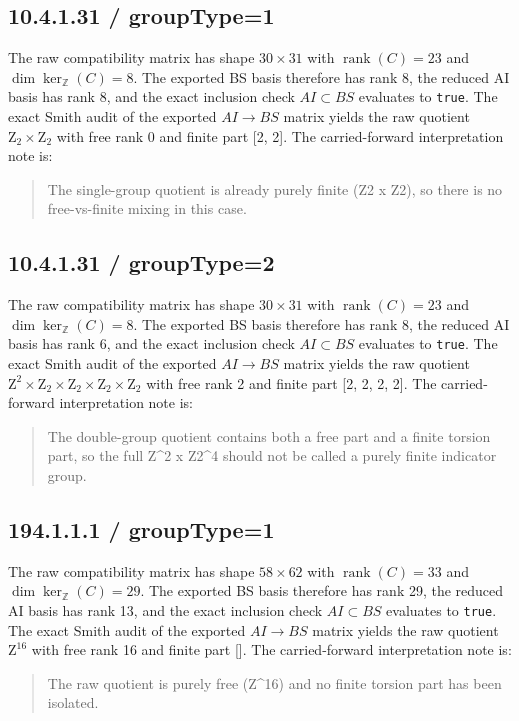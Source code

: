 \documentclass[11pt]{article}
\begin{document}
        \subsection*{10.4.1.31 / groupType=1}
The raw compatibility matrix has shape $30 \times 31$ with
$\operatorname{rank}(C) = 23$ and
$\dim \ker_{\mathbb Z}(C) = 8$.
The exported BS basis therefore has rank 8, the reduced AI basis has rank 8,
and the exact inclusion check $AI \subset BS$ evaluates to \texttt{true}.
The exact Smith audit of the exported $AI \to BS$ matrix yields the raw quotient
$\mathrm{Z}_{2} \times \mathrm{Z}_{2}$ with free rank 0 and finite part [2, 2].
The carried-forward interpretation note is:
\begin{quote}
The single-group quotient is already purely finite (Z2 x Z2), so there is no free-vs-finite mixing in this case.
\end{quote}
\subsection*{10.4.1.31 / groupType=2}
The raw compatibility matrix has shape $30 \times 31$ with
$\operatorname{rank}(C) = 23$ and
$\dim \ker_{\mathbb Z}(C) = 8$.
The exported BS basis therefore has rank 8, the reduced AI basis has rank 6,
and the exact inclusion check $AI \subset BS$ evaluates to \texttt{true}.
The exact Smith audit of the exported $AI \to BS$ matrix yields the raw quotient
$\mathrm{Z}^{2} \times \mathrm{Z}_{2} \times \mathrm{Z}_{2} \times \mathrm{Z}_{2} \times \mathrm{Z}_{2}$ with free rank 2 and finite part [2, 2, 2, 2].
The carried-forward interpretation note is:
\begin{quote}
The double-group quotient contains both a free part and a finite torsion part, so the full Z\textasciicircum{}2 x Z2\textasciicircum{}4 should not be called a purely finite indicator group.
\end{quote}
\subsection*{194.1.1.1 / groupType=1}
The raw compatibility matrix has shape $58 \times 62$ with
$\operatorname{rank}(C) = 33$ and
$\dim \ker_{\mathbb Z}(C) = 29$.
The exported BS basis therefore has rank 29, the reduced AI basis has rank 13,
and the exact inclusion check $AI \subset BS$ evaluates to \texttt{true}.
The exact Smith audit of the exported $AI \to BS$ matrix yields the raw quotient
$\mathrm{Z}^{16}$ with free rank 16 and finite part [].
The carried-forward interpretation note is:
\begin{quote}
The raw quotient is purely free (Z\textasciicircum{}16) and no finite torsion part has been isolated.
\end{quote}
\end{document}
